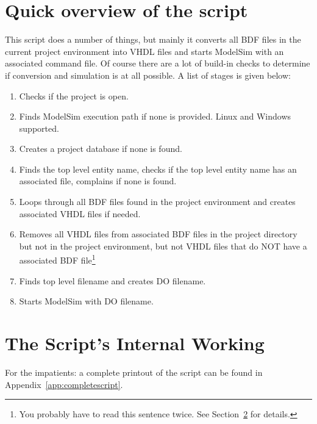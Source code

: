 \documentclass[11pt,a4paper,final,oneside,titlepage,fleqn]{article}
\begin{document}

\section{Quick overview of the script}
\label{sec:overview}
This script does a number of things, but mainly it converts all BDF files in
the current project environment into VHDL files and starts ModelSim with an
associated command file. Of course there are a lot of build-in checks to
determine if conversion and simulation is at all possible. A list of stages
is given below:

\begin{enumerate}
\item Checks if the project is open.
\item Finds ModelSim execution path if none is provided. Linux and Windows
      supported.
\item Creates a project database if none is found.
\item Finds the top level entity name, checks if the top level entity name has
      an associated file, complains if none is found.
\item Loops through all BDF files found in the project environment and creates
      associated VHDL files if needed.
\item\label{item:remove}
      Removes all VHDL files from associated BDF files in the project
      directory but not in the project environment, but not VHDL files that do
      NOT have a associated BDF file\footnote{You probably have to read this
      sentence twice. See Section~\ref{sec:internal} for details.}
\item Finds top level filename and creates DO filename.
\item Starts ModelSim with DO filename.
\end{enumerate}


\section{The Script's Internal Working}
\label{sec:internal}
For the impatients: a complete printout of the script can be found in
Appendix~\ref{app:completescript}. \\
\end{document}
